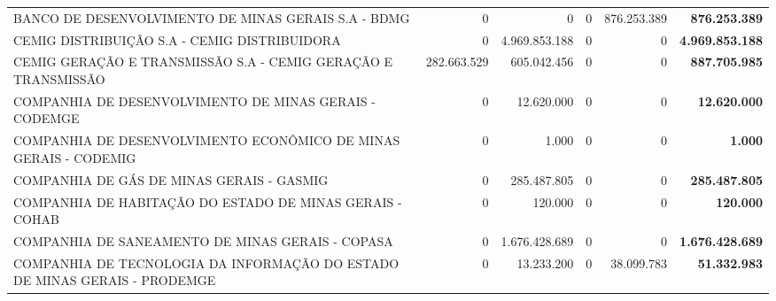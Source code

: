 \documentclass{article}
\begin{document}
\begin{longtable}[c]{m{5.5cm}|m{2.5cm}|m{2.5cm}|m{2.5cm}|m{2cm}|m{2cm}}
\multicolumn{1}{L{5.5cm}|}{BANCO DE DESENVOLVIMENTO DE MINAS GERAIS S.A - BDMG} & \multicolumn{1}{r|}{          0} & \multicolumn{1}{r|}{            0} & \multicolumn{1}{r|}{0} & \multicolumn{1}{r|}{876.253.389} & \multicolumn{1}{r}{ \textbf{876.253.389}} \\
\multicolumn{1}{L{5.5cm}|}{CEMIG DISTRIBUIÇÃO S.A - CEMIG DISTRIBUIDORA} & \multicolumn{1}{r|}{          0} & \multicolumn{1}{r|}{4.969.853.188} & \multicolumn{1}{r|}{0} & \multicolumn{1}{r|}{          0} & \multicolumn{1}{r}{ \textbf{4.969.853.188}} \\
\multicolumn{1}{L{5.5cm}|}{CEMIG GERAÇÃO E TRANSMISSÃO S.A - CEMIG GERAÇÃO E TRANSMISSÃO} & \multicolumn{1}{r|}{282.663.529} & \multicolumn{1}{r|}{605.042.456} & \multicolumn{1}{r|}{0} & \multicolumn{1}{r|}{          0} & \multicolumn{1}{r}{ \textbf{887.705.985}} \\
\multicolumn{1}{L{5.5cm}|}{COMPANHIA DE DESENVOLVIMENTO DE MINAS GERAIS - CODEMGE} & \multicolumn{1}{r|}{          0} & \multicolumn{1}{r|}{12.620.000} & \multicolumn{1}{r|}{0} & \multicolumn{1}{r|}{          0} & \multicolumn{1}{r}{ \textbf{12.620.000}} \\
\multicolumn{1}{L{5.5cm}|}{COMPANHIA DE DESENVOLVIMENTO ECONÔMICO DE MINAS GERAIS - CODEMIG} & \multicolumn{1}{r|}{          0} & \multicolumn{1}{r|}{1.000} & \multicolumn{1}{r|}{0} & \multicolumn{1}{r|}{          0} & \multicolumn{1}{r}{ \textbf{1.000}} \\
\multicolumn{1}{L{5.5cm}|}{COMPANHIA DE GÁS DE MINAS GERAIS - GASMIG} & \multicolumn{1}{r|}{          0} & \multicolumn{1}{r|}{285.487.805} & \multicolumn{1}{r|}{0} & \multicolumn{1}{r|}{          0} & \multicolumn{1}{r}{ \textbf{285.487.805}} \\
\multicolumn{1}{L{5.5cm}|}{COMPANHIA DE HABITAÇÃO DO ESTADO DE MINAS GERAIS - COHAB} & \multicolumn{1}{r|}{          0} & \multicolumn{1}{r|}{120.000} & \multicolumn{1}{r|}{0} & \multicolumn{1}{r|}{          0} & \multicolumn{1}{r}{ \textbf{120.000}} \\
\multicolumn{1}{L{5.5cm}|}{COMPANHIA DE SANEAMENTO DE MINAS GERAIS - COPASA} & \multicolumn{1}{r|}{          0} & \multicolumn{1}{r|}{1.676.428.689} & \multicolumn{1}{r|}{0} & \multicolumn{1}{r|}{          0} & \multicolumn{1}{r}{ \textbf{1.676.428.689}} \\
\multicolumn{1}{L{5.5cm}|}{COMPANHIA DE TECNOLOGIA DA INFORMAÇÃO DO ESTADO DE MINAS GERAIS - PRODEMGE} & \multicolumn{1}{r|}{          0} & \multicolumn{1}{r|}{13.233.200} & \multicolumn{1}{r|}{0} & \multicolumn{1}{r|}{38.099.783} & \multicolumn{1}{r}{ \textbf{51.332.983}} \\

\end{longtable}
\end{document}
